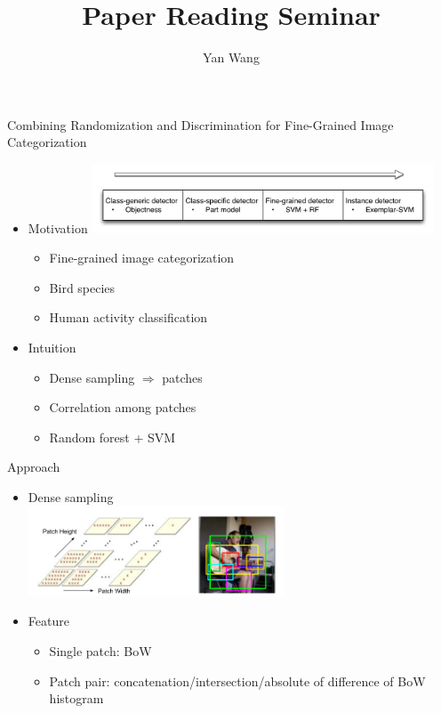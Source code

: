\documentclass[12pt]{beamer}
\author{Yan Wang}
\title{Paper Reading Seminar}
\subtitle{}
\begin{document}
\begin{frame}[plain]
    \titlepage
\end{frame}

\begin{frame}{Combining Randomization and Discrimination for Fine-Grained Image Categorization}
    \begin{itemize}
        \item Motivation
        \medskip
        { \includegraphics[width=0.8\textwidth]{motivation.png} } 
        \begin{itemize}
            \item Fine-grained image categorization
            \item Bird species
            \item Human activity classification
        \end{itemize}
        \item Intuition
        \begin{itemize}
            \item Dense sampling $\Rightarrow$ patches
            \item Correlation among patches
            \item Random forest + SVM
        \end{itemize}
    \end{itemize}
\end{frame}

\begin{frame}{Approach}
    \begin{itemize}
        \item Dense sampling \\
        \medskip
        { \includegraphics[width=0.6\textwidth]{fffig2.png} } \\
        \item Feature
        \begin{itemize}
            \item Single patch: BoW
            \item Patch pair: concatenation/intersection/absolute of difference of BoW histogram
        \end{itemize} 
    \end{itemize}
\end{frame}
\end{document}
